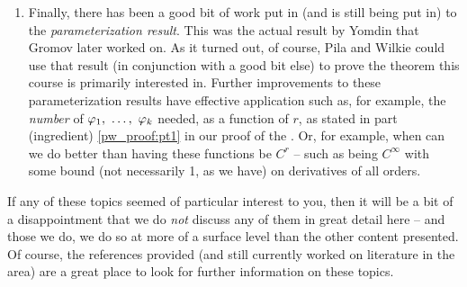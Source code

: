\begin{remark}
\begin{enumerate}
    \item Finally, there has been a good bit of work put in (and is still being put in) to the \emph{parameterization result}. This was the actual result by Yomdin that Gromov later worked on. As it turned out, of course, Pila and Wilkie could use that result (in conjunction with a good bit else) to prove the theorem this course is primarily interested in. Further improvements to these parameterization results have effective application such as, for example, the \emph{number} of $\varphi_1, \ \hdots, \ \varphi_{k}$ needed, as a function of $r$, as stated in part (ingredient) \ref{pw_proof:pt1} in our proof of the \pwt. Or, for example, when can we do better than having these functions be $C^r$ -- such as being $C^{\infty}$ with some bound (not necessarily 1, as we have) on derivatives of all orders.
  \end{enumerate}
\end{remark}

If any of these topics seemed of particular interest to you, then it will be a bit of a disappointment that we do  \emph{not} discuss any of them in great detail here -- and those we do, we do so at more of a surface level than the other content presented. Of course, the references provided (and still currently worked on literature in the area) are a great place to look for further information on these topics.
